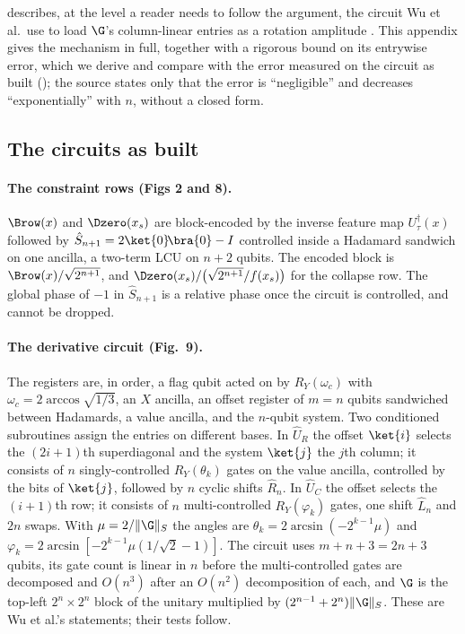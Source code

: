 describes, at the level a reader needs to follow the
argument, the circuit Wu et al.\ use to load $\G$'s column-linear entries as a
rotation amplitude \cite{wu2025pihm}. This appendix gives the mechanism in full,
together with a rigorous bound on its entrywise error, which we derive and
compare with the error measured on the circuit as built
(); the source states only that the error is ``negligible'' and
decreases ``exponentially'' with $n$, without a closed form.

\subsection{The circuits as built}
\label{app:published-build}

\paragraph{The constraint rows (Figs 2 and 8).} $\Brow(x)$ and $\Dzero(x_s)$ are block-encoded by the inverse feature map $U_\tau^\dagger(x)$ followed by $\hat S_{n+1} = 2\ket{0}\!\bra{0}-I$ controlled inside a Hadamard sandwich on one ancilla, a two-term LCU on $n+2$ qubits. The encoded block is $\Brow(x)/\sqrt{2^{n+1}}$, and $\Dzero(x_s)/\bigl(\sqrt{2^{n+1}}/f(x_s)\bigr)$ for the collapse row. The global phase of $-1$ in $\hat S_{n+1}$ is a relative phase once the circuit is controlled, and cannot be dropped.

\paragraph{The derivative circuit (Fig.\ 9).} The registers are, in order, a flag qubit acted on by $R_Y(\omega_c)$ with $\omega_c = 2\arccos\sqrt{1/3}$, an $X$ ancilla, an offset register of $m = n$ qubits sandwiched between Hadamards, a value ancilla, and the $n$-qubit system. Two conditioned subroutines assign the entries on different bases. In $\hat U_R$ the offset $\ket{i}$ selects the $(2i+1)$th superdiagonal and the system $\ket{j}$ the $j$th column; it consists of $n$ singly-controlled $R_Y(\theta_k)$ gates on the value ancilla, controlled by the bits of $\ket{j}$, followed by $n$ cyclic shifts $\hat R_n$. In $\hat U_C$ the offset selects the $(i+1)$th row; it consists of $n$ multi-controlled $R_Y(\varphi_k)$ gates, one shift $\hat L_n$ and $2n$ swaps. With $\mu = 2/\|\G\|_S$ the angles are $\theta_k = 2\arcsin(-2^{k-1}\mu)$ and $\varphi_k = 2\arcsin[-2^{k-1}\mu(1/\sqrt2-1)]$. The circuit uses $m+n+3 = 2n+3$ qubits, its gate count is linear in $n$ before the multi-controlled gates are decomposed and $O(n^3)$ after an $O(n^2)$ decomposition of each, and $\G$ is the top-left $2^n\times2^n$ block of the unitary multiplied by $(2^{n-1}+2^n)\|\G\|_S$. These are Wu et al.'s statements; their tests follow.

